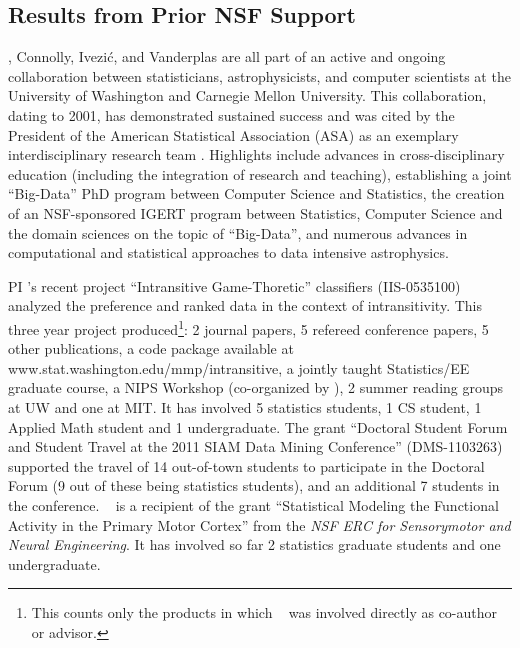 \subsection{             Results from Prior NSF Support             }
\label{sec:priorNSF}
\vspace{-0.8em}
\meila, Connolly, Ivezi\'{c}, and Vanderplas are all part of an active
and ongoing collaboration between statisticians, astrophysicists, and
computer scientists at the University of Washington and Carnegie
Mellon University.  This collaboration, dating to 2001, has
demonstrated sustained success and was cited by the President of the
American Statistical Association (ASA) as an exemplary
interdisciplinary research team \cite{straf03}. Highlights
include advances in cross-disciplinary education
(including the integration of research and teaching), establishing a
joint ``Big-Data'' PhD program between Computer Science and
Statistics, the creation of an NSF-sponsored IGERT program between
Statistics, Computer Science and the domain sciences on the topic of
``Big-Data'', and numerous advances in computational and statistical
approaches to data intensive astrophysics.

PI \meila's recent project ``Intransitive Game-Thoretic'' classifiers
(IIS-0535100) analyzed the preference and ranked data in the context
of intransitivity. This three year project produced\footnote{This
  counts only the products in which \meila~ was involved directly as
  co-author or advisor.}: 2 journal papers, 5 refereed conference
papers, 5 other publications, a code package available at
{www.stat.washington.edu/mmp/intransitive}, a jointly taught
Statistics/EE graduate course, a NIPS Workshop (co-organized by
\meila), 2 summer reading groups at UW and one at MIT. It has involved
5 statistics students, 1 CS student, 1 Applied Math student and 1
undergraduate. The grant ``Doctoral Student Forum and Student Travel
at the 2011 SIAM Data Mining Conference'' (DMS-1103263) supported the
travel of 14 out-of-town students to participate in the Doctoral Forum
(9 out of these being statistics students), and an additional 7
students in the conference. 
\meila~ is a recipient of the grant ``Statistical Modeling the
Functional Activity in the Primary Motor Cortex'' from the {\em NSF
  ERC for Sensorymotor and Neural Engineering}. It has involved so far 2 statistics graduate students and one
undergraduate.

